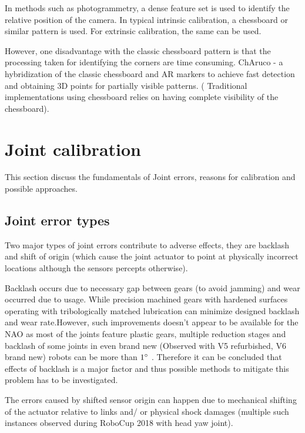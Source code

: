 \documentclass[english, printversion, nomenclature, notitle]{tuvisionthesis} %
\begin{document}
In methods such as photogrammetry, a dense feature set is used to identify the relative position of the camera. In typical intrinsic calibration, a chessboard or similar pattern is used. For extrinsic calibration, the same can be used.

However, one disadvantage with the classic chessboard pattern is that the processing taken for identifying the corners are time consuming. ChAruco - a hybridization of the classic chessboard and AR markers to achieve fast detection and obtaining 3D points for partially visible patterns. ( Traditional implementations using chessboard relies on having complete visibility of the chessboard).  

\section{Joint calibration}
This section discuss the fundamentals of Joint errors, reasons for calibration and possible approaches.

\subsection{Joint error types}
Two major types of joint errors contribute to adverse effects, they are backlash and shift of origin (which cause the joint actuator to point at physically incorrect locations although the sensors percepts otherwise). 

Backlash occurs due to necessary gap between gears (to avoid jamming) and wear occurred due to usage. While precision machined gears with hardened surfaces operating with tribologically matched lubrication can minimize designed backlash and wear rate.However, such improvements doesn't appear to be available for the NAO as most of the joints feature plastic gears, multiple reduction stages and backlash of some joints in even brand new (Observed with V5 refurbished, V6 brand new) robots can be more than $1\degree$ . Therefore it can be concluded that effects of backlash is a major factor and thus possible methods to mitigate this problem has to be investigated.

The errors caused by shifted sensor origin can happen due to mechanical shifting of the actuator relative to links and/ or physical shock damages (multiple such instances observed during RoboCup 2018 with head yaw joint).
\end{document}
